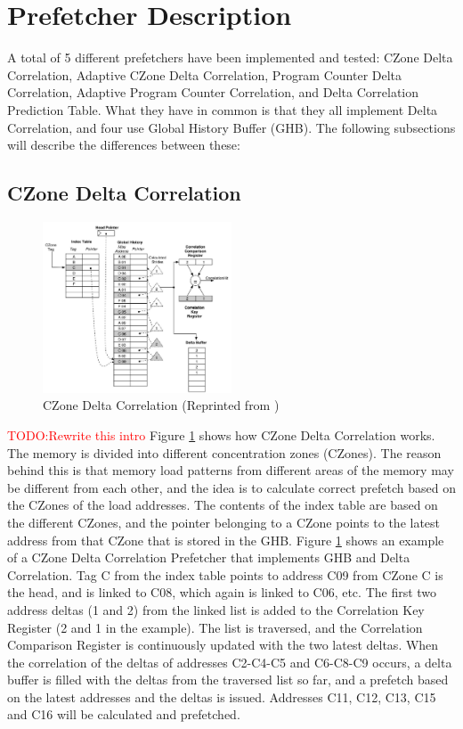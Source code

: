 \documentclass[a4paper]{IEEEtran}
\newcommand\TODO[1]{\textcolor{red}{TODO:#1}}
\newcommand\todo[1]{\TODO{#1}}
\begin{document}
\section{Prefetcher Description}

A total of 5 different prefetchers have been implemented and tested: CZone Delta Correlation, Adaptive CZone Delta Correlation, Program Counter Delta Correlation, Adaptive Program Counter Correlation, and Delta Correlation Prediction Table. 
What they have in common is that they all implement Delta Correlation, and four use Global History Buffer (GHB). 
The following subsections will describe the differences between these:

\subsection{CZone Delta Correlation}

\begin{figure}[!ht]
  \centering
      \includegraphics[width=0.5\textwidth]{Figures/CDC}
  \caption{CZone Delta Correlation (Reprinted from \protect\cite{acdc})}
  \label{fig:CDC}
\end{figure}

\todo{Rewrite this intro}
Figure \ref{fig:CDC} shows how CZone Delta Correlation works. 
The memory is divided into different concentration zones (CZones). 
The reason behind this is that memory load patterns from different areas of the memory may be different from each other, and the idea is to calculate correct prefetch based on the CZones of the load addresses.
The contents of the index table are based on the different CZones, and the pointer belonging to a CZone points to the latest address from that CZone that is stored in the GHB.
Figure \ref{fig:CDC} shows an example of a CZone Delta Correlation Prefetcher that implements GHB and Delta Correlation. 
Tag C from the index table points to address C09 from CZone C is the head, and is linked to C08,  which again is linked to C06, etc. 
The first two address deltas (1 and 2) from the linked list is added to the Correlation Key Register (2 and 1 in the example). 
The list is traversed, and the Correlation Comparison Register is continuously updated with the two latest deltas. 
When the correlation of the deltas of addresses C2-C4-C5 and C6-C8-C9  occurs, a delta buffer is filled with the deltas from the traversed list so far, and a prefetch based on the latest addresses and the deltas is issued.
Addresses C11, C12, C13, C15 and C16 will be calculated and prefetched.
 
\end{document}
